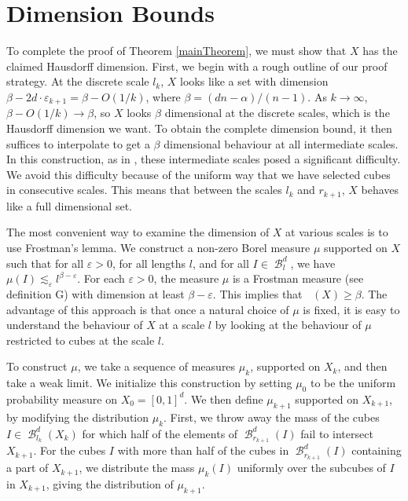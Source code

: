 \documentclass[dvipsnames,letterpaper,12pt]{article}
\theoremstyle{plain}
\DeclareMathOperator{\hausdim}{\dim_{\mathbf{H}}}
\DeclareMathOperator{\B}{\mathcal{B}}
\begin{document}
\section{Dimension Bounds}\label{dimensionsection}

To complete the proof of Theorem \ref{mainTheorem}, we must show that $X$ has the claimed Hausdorff dimension. First, we begin with a rough outline of our proof strategy. At the discrete scale $l_k$, $X$ looks like a set with dimension $\beta - 2d \cdot \varepsilon_{k+1} = \beta - O(1/k)$, where $\beta = (dn - \alpha)/(n-1)$. As $k \to \infty$, $\beta - O(1/k) \to \beta$, so $X$ looks $\beta$ dimensional at the discrete scales, which is the Hausdorff dimension we want. To obtain the complete dimension bound, it then suffices to interpolate to get a $\beta$ dimensional behaviour at all intermediate scales. In this construction, as in \cite{MalabikaRob}, these intermediate scales posed a significant difficulty. We avoid this difficulty because of the uniform way that we have selected cubes in consecutive scales. This means that between the scales $l_k$ and $r_{k+1}$, $X$ behaves like a full dimensional set.

The most convenient way to examine the dimension of $X$ at various scales is to use Frostman's lemma. We construct a non-zero Borel measure $\mu$ supported on $X$ such that for all $\varepsilon > 0$, for all lengths $l$, and for all $I \in \B^d_l$, we have $\mu(I) \lesssim_\varepsilon l^{\beta - \varepsilon}$. For each $\varepsilon > 0$, the measure $\mu$ is a Frostman measure (see definition G) with dimension at least $\beta - \varepsilon$. This implies that $\hausdim(X) \geq \beta$. The advantage of this approach is that once a natural choice of $\mu$ is fixed, it is easy to understand the behaviour of $X$ at a scale $l$ by looking at the behaviour of $\mu$ restricted to cubes at the scale $l$.

To construct $\mu$, we take a sequence of measures $\mu_k$, supported on $X_k$, and then take a weak limit. We initialize this construction by setting $\mu_0$ to be the uniform probability measure on $X_0 = [0,1]^d$. We then define $\mu_{k+1}$ supported on $X_{k+1}$, by modifying the distribution $\mu_k$. First, we throw away the mass of the cubes $I \in \B^d_{l_k}(X_k)$ for which half of the elements of $\B^d_{r_{k+1}}(I)$ fail to intersect $X_{k+1}$. For the cubes $I$ with more than half of the cubes in $\B^d_{r_{k+1}}(I)$ containing a part of $X_{k+1}$, we distribute the mass $\mu_k(I)$ uniformly over the subcubes of $I$ in $X_{k+1}$, giving the distribution of $\mu_{k+1}$.
\end{document}
